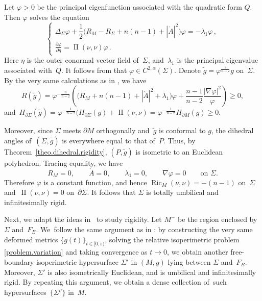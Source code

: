 \documentclass[10pt,a4paper]{amsart}
\numberwithin{equation}{section}
\theoremstyle{definition}
\DeclareMathOperator{\Ric}{Ric}
\DeclareMathOperator{\secondfund}{II}
\newcommand{\pa}[2]{\frac{\partial #1}{\partial #2}}
\begin{document}
Let $\varphi>0$ be the principal eigenfunction associated with the quadratic form $Q$. Then $\varphi$ solves the equation
\begin{equation}
\begin{cases}
\Delta_\Sigma \varphi+\dfrac{1}{2}\big(R_M-R_\Sigma + n(n-1)+|\mathring{A}|^2\big)\varphi = -\lambda_1\varphi\,,
\\
\displaystyle\pa{\varphi}{\eta}=\secondfund(\nu,\nu)\varphi\,.
\end{cases}
\end{equation}
Here $\eta$ is the outer conormal vector field of~$\Sigma$, and~$\lambda_1$ is the principal eigenvalue associated with~$Q$. It follows from \cite[Lemma 4.1]{li2019dihedral} that $\varphi\in C^{2,\alpha}(\Sigma)$. Denote $\tilde{g}=\varphi^{\frac{2}{n-2}}g$ on~$\Sigma$. By the very same calculations as in \cite[equations~(4.6) and~(4.7)]{li2019dihedral}, we have
\[R(\tilde{g})=\varphi^{-\frac{n}{n-2}}\left(\big(R_M+n(n-1)+|\mathring{A}|^2+\lambda_1\big)\varphi+\frac{n-1}{n-2}\frac{|\nabla \varphi|^2}{\varphi}\right)\ge 0,\]
and~$H_{\partial \Sigma}(\tilde g)=\varphi^{-\frac{1}{n-2}}(H_{\partial \Sigma}(g)+\secondfund(\nu,\nu)=\varphi^{-\frac{1}{n-2}} H_{\partial M}(g)\ge 0$.

Moreover, since $\Sigma$ meets $\partial M$ orthogonally and~$\tilde{g}$ is conformal to $g$, the dihedral angles of~$(\Sigma,\tilde{g})$ is everywhere equal to that of~$P$. Thus, by Theorem~\ref{theo.dihedral.rigidity}, $(P,\tilde{g})$ is isometric to an Euclidean polyhedron. Tracing equality, we have
\[
R_M=0,\qquad \mathring A=0,\qquad \lambda_1=0,\qquad \nabla \varphi=0 \qquad \text{on }\Sigma.
\]
Therefore $\varphi$ is a constant function, and hence $\Ric_M(\nu,\nu)=-(n-1)$ on~$\Sigma$ and~$\secondfund(\nu,\nu)=0$ on~$\partial \Sigma$. It follows that $\Sigma$ is totally umbilical and infinitesimally rigid.


Next, we adapt the ideas in~\cite{CarlottoChodoshEichmair2016effective,ChodoshEichmairMoraru2018splitting} to study rigidity. Let $M^-$ be the region enclosed by~$\Sigma$ and~$F_B$. We~follow the same argument as in \cite[Section~4]{li2019dihedral}: by constructing the very same deformed metrics $\{g(t)\}_{t\in [0,\varepsilon)}$, solving the relative isoperimetric problem \eqref{problem.variation} and taking convergence as $t\rightarrow 0$, we obtain another free-boundary isoperimetric hypersurface $\Sigma'$ in $(M,g)$ lying between $\Sigma$ and~$F_B$. Moreover, $\Sigma'$ is also isometrically Euclidean, and is umbilical and infinitesimally rigid. By repeating this argument, we obtain a dense collection of~such hypersurfaces~$\{\Sigma^\rho\}$ in~$M$.
\end{document}
